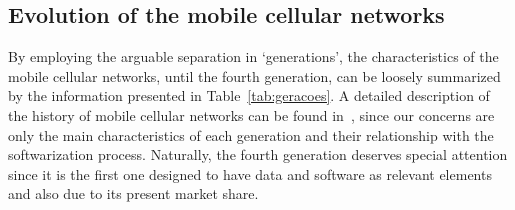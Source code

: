 \subsection{Evolution of the mobile cellular networks}

By employing the arguable separation in `generations', the characteristics of the mobile cellular networks, until the fourth generation, can be loosely summarized by the information presented in Table~\ref{tab:geracoes}. A detailed description of the history of mobile cellular networks can be found in~\cite{stallings2014data,schiller2003mobile}, since our concerns are only the main characteristics of each generation and their relationship with the softwarization process. Naturally, the fourth generation deserves special attention since it is the first one designed to have data and software as relevant elements and also due to its present market share.

